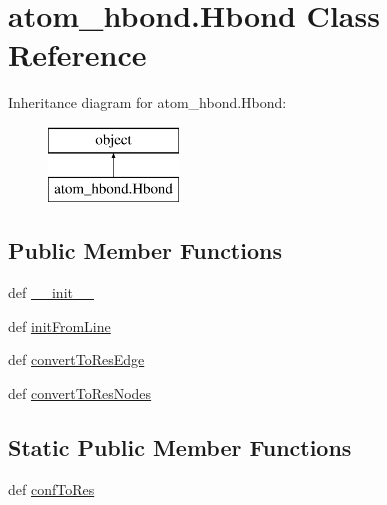\hypertarget{classatom__hbond_1_1_hbond}{\section{atom\-\_\-hbond.\-Hbond Class Reference}
\label{classatom__hbond_1_1_hbond}
}
Inheritance diagram for atom\-\_\-hbond.\-Hbond\-:\begin{figure}[H]
\begin{center}
\leavevmode
\includegraphics[height=2.000000cm]{classatom__hbond_1_1_hbond}
\end{center}
\end{figure}
\subsection*{Public Member Functions}
\begin{DoxyCompactItemize}
\item 
def \hyperlink{classatom__hbond_1_1_hbond_a8aa7838bbdab8ff6a95df2f2251b9ad5}{\-\_\-\-\_\-init\-\_\-\-\_\-}
\item 
def \hyperlink{classatom__hbond_1_1_hbond_a18151de3db93d22fc62495353e6b1e98}{init\-From\-Line}
\item 
def \hyperlink{classatom__hbond_1_1_hbond_a693582d9198e224eebac628cb8ea5401}{convert\-To\-Res\-Edge}
\item 
def \hyperlink{classatom__hbond_1_1_hbond_a68014f266ecb935af0ed8285c70492f4}{convert\-To\-Res\-Nodes}
\end{DoxyCompactItemize}
\subsection*{Static Public Member Functions}
\begin{DoxyCompactItemize}
\item 
def \hyperlink{classatom__hbond_1_1_hbond_a4e3baeacf725355da76613310b7f0d7f}{conf\-To\-Res}
\end{DoxyCompactItemize}

